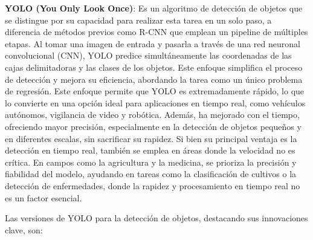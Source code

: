 \textbf{YOLO (You Only Look Once)}: Es un algoritmo de detección de objetos que se distingue por su capacidad para realizar esta tarea en un solo paso, a diferencia de métodos previos como R-CNN que emplean un pipeline de múltiples etapas. Al tomar una imagen de entrada y pasarla a través de una red neuronal convolucional (CNN), YOLO predice simultáneamente las coordenadas de las cajas delimitadoras y las clases de los objetos. Este enfoque simplifica el proceso de detección y mejora su eficiencia, abordando la tarea como un único problema de regresión.
Este enfoque permite que YOLO es extremadamente rápido, lo que lo convierte en una opción ideal para aplicaciones en tiempo real, como vehículos autónomos, vigilancia de video y robótica. Además, ha mejorado con el tiempo, ofreciendo mayor precisión, especialmente en la detección de objetos pequeños y en diferentes escalas, sin sacrificar su rapidez.
Si bien su principal ventaja es la detección en tiempo real, también se emplea en áreas donde la velocidad no es crítica. En campos como la agricultura y la medicina, se prioriza la precisión y fiabilidad del modelo, ayudando en tareas como la clasificación de cultivos o la detección de enfermedades, donde la rapidez y procesamiento en tiempo real no es un factor esencial\cite{sanchez2020evaluacion}\cite{terven2023yolo}.

Las versiones de YOLO para la detección de objetos, destacando sus innovaciones clave, son\cite{sapkota2025yolo}\cite{terven2023yolo}:

